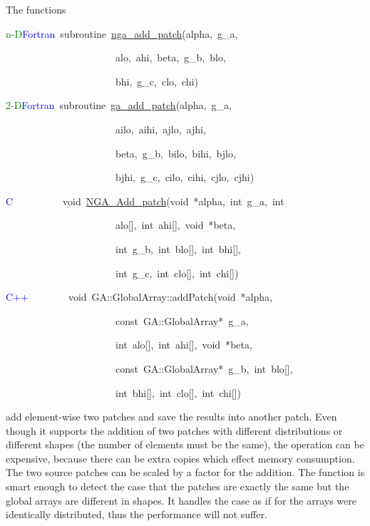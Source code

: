 The functions
\begin{lyxcode}
\textcolor{green}{n-D}\textcolor{blue}{Fortran}~subroutine~\href{http://www.emsl.pnl.gov/docs/global/ga_ops.html\#ga_add_patch}{nga\_{}add\_{}patch}(alpha,~g\_a,~

~~~~~~~~~~~~~~~~~~~~~~alo,~ahi,~beta,~g\_b,~blo,~

~~~~~~~~~~~~~~~~~~~~~~bhi,~g\_c,~clo,~chi)~

\textcolor{green}{2-D}\textcolor{blue}{Fortran}~subroutine~\href{http://www.emsl.pnl.gov/docs/global/ga_ops.html\#ga_add_patch}{ga\_{}add\_{}patch}(alpha,~g\_a,~

~~~~~~~~~~~~~~~~~~~~~~ailo,~aihi,~ajlo,~ajhi,~

~~~~~~~~~~~~~~~~~~~~~~beta,~g\_b,~bilo,~bihi,~bjlo,~

~~~~~~~~~~~~~~~~~~~~~~bjhi,~g\_c,~cilo,~cihi,~cjlo,~cjhi)~

\textcolor{blue}{C}~~~~~~~~~~void~\href{http://www.emsl.pnl.gov/docs/global/c_nga_ops.html\#ga_add_patch}{NGA\_{}Add\_{}patch}(void~{*}alpha,~int~g\_a,~int~

~~~~~~~~~~~~~~~~~~~~~~alo{[}{]},~int~ahi{[}{]},~void~{*}beta,~

~~~~~~~~~~~~~~~~~~~~~~int~g\_b,~int~blo{[}{]},~int~bhi{[}{]},~

~~~~~~~~~~~~~~~~~~~~~~int~g\_c,~int~clo{[}{]},~int~chi{[}{]})~

\textcolor{blue}{C++}~~~~~~~~void~GA::GlobalArray::addPatch(void~{*}alpha,~

~~~~~~~~~~~~~~~~~~~~~~const~GA::GlobalArray{*}~g\_a,~

~~~~~~~~~~~~~~~~~~~~~~int~alo{[}{]},~int~ahi{[}{]},~void~{*}beta,~

~~~~~~~~~~~~~~~~~~~~~~const~GA::GlobalArray{*}~g\_b,~int~blo{[}{]},~

~~~~~~~~~~~~~~~~~~~~~~int~bhi{[}{]},~int~clo{[}{]},~int~chi{[}{]})~
\end{lyxcode}
add element-wise two patches and save the results into another patch.
Even though it supports the addition of two patches with different
distributions or different shapes (the number of elements must be
the same), the operation can be expensive, because there can be extra
copies which effect memory consumption. The two source patches can
be scaled by a factor for the addition. The function is smart enough
to detect the case that the patches are exactly the same but the global
arrays are different in shapes. It handles the case as if for the
arrays were identically distributed, thus the performance will not
suffer.


